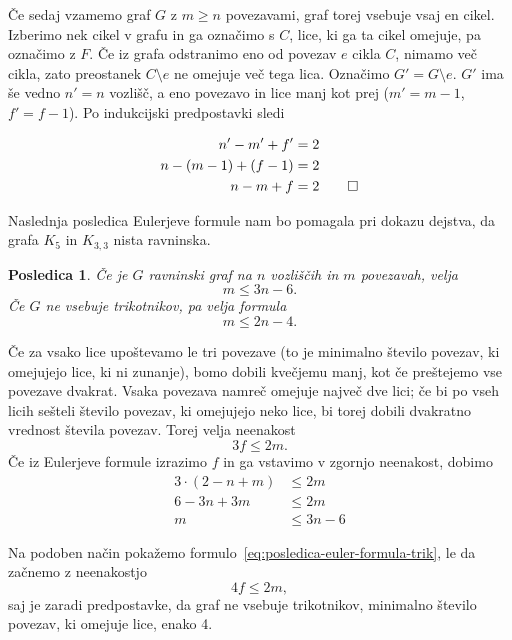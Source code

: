 \documentclass[12pt,a4paper]{amsart}
\theoremstyle{definition} %
\theoremstyle{plain} %
\newtheorem{posledica}[definicija]{Posledica}
\begin{document}
    Če sedaj vzamemo graf $G$ z $m \geq n$ povezavami, graf torej vsebuje vsaj en cikel. Izberimo nek cikel v grafu in ga označimo s $C$, lice, ki ga ta cikel omejuje, pa označimo z $F$. Če iz grafa odstranimo eno od povezav $e$ cikla $C$, nimamo več cikla, zato preostanek $C \setminus e$ ne omejuje več tega lica. Označimo $G' = G \setminus e$. $G'$ ima še vedno $n'=n$ vozlišč, a eno povezavo in lice manj kot prej ($m'=m-1$, $f'=f-1$). Po indukcijski predpostavki sledi
    
    \begin{align*}
        n' - m' + f'      &= 2 \\
        n - (m-1) + (f-1) &= 2 \\
        n - m + f         &= 2 \qedhere
    \end{align*}
\endproof

Naslednja posledica Eulerjeve formule nam bo pomagala pri dokazu dejstva, da grafa $K_5$ in $K_{3,3}$ nista ravninska.

\begin{posledica}
    Če je $G$ ravninski graf na $n$ vozliščih in $m$ povezavah, velja
    \begin{equation} 
    \label{eq:posledica-euler-formula}
    m \leq 3n - 6.
    \end{equation}
    Če $G$ ne vsebuje trikotnikov, pa velja formula
    \begin{equation} 
    \label{eq:posledica-euler-formula-trik}
    m \leq 2n - 4.
    \end{equation}
\end{posledica}

\proof
    Če za vsako lice upoštevamo le tri povezave (to je minimalno število povezav, ki omejujejo lice, ki ni zunanje), bomo dobili kvečjemu manj, kot če preštejemo vse povezave dvakrat.
    Vsaka povezava namreč omejuje največ dve lici; če bi po vseh licih sešteli število povezav, ki omejujejo neko lice, bi torej dobili dvakratno vrednost števila povezav.
    Torej velja neenakost
    \[ 3f \leq 2m .\]
    Če iz Eulerjeve formule izrazimo $f$ in ga vstavimo v zgornjo neenakost, dobimo
    \begin{align*}
        3\cdot(2-n+m) &\leq 2m \\
        6 - 3n + 3m &\leq 2m \\
        m &\leq 3n - 6
    \end{align*}
    
    Na podoben način pokažemo formulo~\eqref{eq:posledica-euler-formula-trik}, le da začnemo z neenakostjo 
    \[ 4f \leq 2m, \]
    saj je zaradi predpostavke, da graf ne vsebuje trikotnikov, minimalno število povezav, ki omejuje lice, enako 4. 
\endproof
\end{document}
